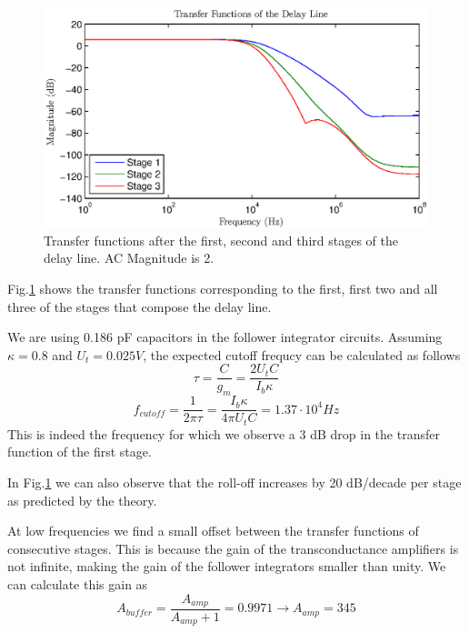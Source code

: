 \begin{figure}[!h]
	\center
	\includegraphics{exp2.eps}
	\caption{Transfer functions after the first, second and third stages of the delay line. AC Magnitude is 2.}
	\label{fig:3}
\end{figure}
Fig.\ref{fig:3} shows the transfer functions corresponding to the first, first two and all three of the stages that compose the delay line. 

We are using 0.186 pF capacitors in the follower integrator circuits. Assuming \(\kappa=0.8\) and \(U_t=0.025V\), the expected cutoff frequcy can be calculated as follows
\begin{equation*}
	\tau = \frac{C}{g_m} = \frac{2U_tC}{I_b\kappa} 
\end{equation*}
\begin{equation*}
	f_{cutoff} = \frac{1}{2\pi\tau} = \frac{I_b\kappa}{4\pi U_tC} = 1.37\cdot10^{4} Hz
\end{equation*}
This is indeed the frequency for which we observe a 3 dB drop in the transfer function of the first stage. 

In Fig.\ref{fig:3} we can also observe that the roll-off increases by 20 dB/decade per stage as predicted by the theory.

At low frequencies we find a small offset between the transfer functions of consecutive stages. This is because the gain of the transconductance amplifiers is not infinite, making the gain of the follower integrators smaller than unity. We can calculate this gain as
\begin{equation*}
	A_{buffer}=\frac{A_{amp}}{A_{amp}+1} = 0.9971 \rightarrow A_{amp} = 345 
\end{equation*}



